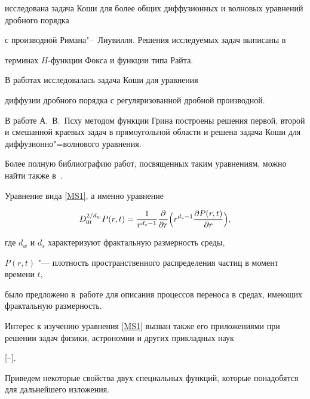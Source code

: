исследована задача Коши для более общих диффузионных и волновых уравнений дробного порядка

с производной Римана"--~Лиувилля. Решения исследуемых задач выписаны в

терминах $H$-функции Фокса и функции типа Райта.

В работах \cite{Kochubei_1, Kochubei_2} исследовалась задача Коши для уравнения

диффузии дробного порядка с регуляризованной дробной производной. 



В работе  А.~В.~Псху \cite{Pskhu}  методом функции Грина построены решения первой, второй и смешанной краевых задач в прямоугольной области и решена задача Коши для диффузионно"=волнового уравнения. 

Более полную библиографию работ, посвященных таким уравнениям, можно найти также в~\cite{Pskhu}.



Уравнение вида  \eqref{MS1}, а именно уравнение 

$$

D^{2/d_w}_{0t}P(r,t)=\frac{1}{r^{d_s-1}}\frac{\partial}{\partial r}\Bigl(r^{d_s-1}\frac{\partial P(r,t)}{\partial r}\Bigr),

$$

где $d_w$ и  $d_s$ характеризуют фрактальную размерность среды,

$P(r,t)$ "--- плотность пространственного распределения частиц в момент времени $t,$

было предложено в~работе  \cite{MetzlerGlockleNonnenmacher} для описания процессов переноса в средах, имеющих фрактальную размерность.



 Интерес к изучению уравнения \eqref{MS1} вызван также его приложениями при решении  задач физики, астрономии и других прикладных наук

[--]. 






\smallskip



 Приведем некоторые свойства двух специальных функций, которые понадобятся для дальнейшего изложения.



\smallskip



